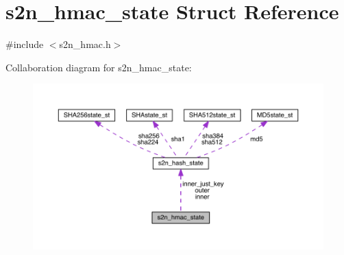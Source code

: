 \hypertarget{structs2n__hmac__state}{}\section{s2n\+\_\+hmac\+\_\+state Struct Reference}
\label{structs2n__hmac__state}


{\ttfamily \#include $<$s2n\+\_\+hmac.\+h$>$}



Collaboration diagram for s2n\+\_\+hmac\+\_\+state\+:\nopagebreak
\begin{figure}[H]
\begin{center}
\leavevmode
\includegraphics[width=350pt]{structs2n__hmac__state__coll__graph}
\end{center}
\end{figure}

